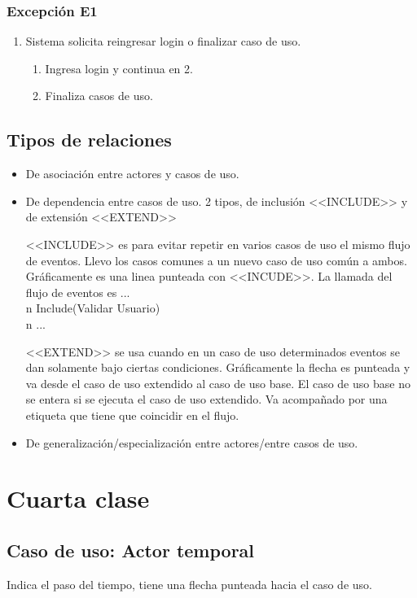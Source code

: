 \documentclass[titlepage,a4paper]{article}
\begin{document}
\subsubsection*{Excepción E1}
\begin{enumerate}
    \item Sistema solicita reingresar login o finalizar caso de uso.
    \begin{enumerate}
        \item Ingresa login y continua en 2.
        \item Finaliza casos de uso.
    \end{enumerate}
\end{enumerate}


\subsection*{Tipos de relaciones}
\begin{itemize}
    \item De asociación entre actores y casos de uso.
    \item De dependencia entre casos de uso. 2 tipos, de inclusión <<INCLUDE>> y de extensión <<EXTEND>>
    
    <<INCLUDE>> es para evitar repetir en varios casos de uso el mismo flujo de eventos. Llevo los casos comunes a un nuevo caso de uso común a ambos. Gráficamente es una linea punteada con <<INCUDE>>. La llamada del flujo de eventos es ... \\n Include(Validar Usuario)  \\n ...
    
    <<EXTEND>> se usa cuando en un caso de uso determinados eventos se dan solamente bajo ciertas condiciones. Gráficamente la flecha es punteada y va desde el caso de uso extendido al caso de uso base. El caso de uso base no se entera si se ejecuta el caso de uso extendido. Va acompañado por una etiqueta que tiene que coincidir en el flujo.
    
    \item De generalización/especialización entre actores/entre casos de uso.
\end{itemize}


\section*{Cuarta clase}
\subsection*{Caso de uso: Actor temporal}
Indica el paso del tiempo, tiene una flecha punteada hacia el caso de uso. %
\end{document}
